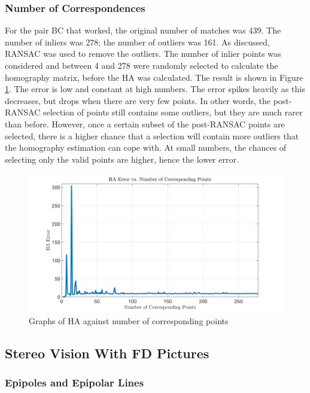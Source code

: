 \documentclass[a4paper, 10pt, conference]{ieeeconf}
\begin{document}
\subsubsection{Number of Correspondences}


For the pair BC that worked, the original number of matches was 439. The number of inliers was 278; the number of outliers was 161. As discussed, RANSAC was used to remove the outliers. The number of inlier points was considered and between 4 and 278 were randomly selected to calculate the homography matrix, before the HA was calculated. The result is shown in Figure \ref{fig:outliers}. The error is low and constant at high numbers. The error spikes heavily as this decreases, but drops when there are very few points. In other words, the post-RANSAC selection of points still contains some outliers, but they are much rarer than before. However, once a certain subset of the post-RANSAC points are selected, there is a higher chance that a selection will contain more outliers that the homography estimation can cope with. At small numbers, the chances of selecting only the valid points are higher, hence the lower error.

\begin{figure}[!ht]
  \centering
  \includegraphics[width=0.75\linewidth]{pic/q2_1_c}
  \caption{Graphs of HA against number of corresponding points}
  \vspace{-0.5cm}
  \label{fig:outliers}
\end{figure}

\subsection{Stereo Vision With FD Pictures}
\subsubsection{Epipoles and Epipolar Lines}
\end{document}
